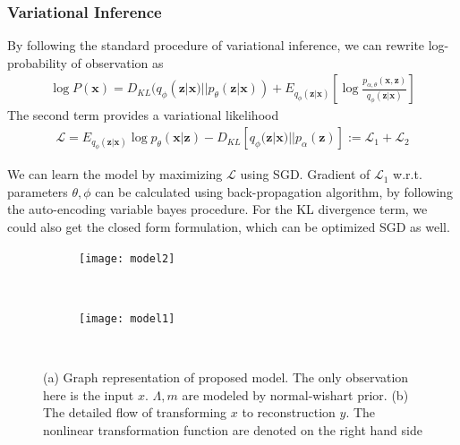 \subsubsection{Variational Inference}
By following the standard procedure of variational inference, we can rewrite log-probability of observation as
\begin{align}
\log P(\mathbf{x}) = D_{KL}(q_{\phi}(\mathbf{z}|\mathbf{x}) || p_{\theta}(\mathbf{z}|\mathbf{x})) + E_{q_{\phi}(\mathbf{z}|\mathbf{x})}[\log \frac{p_{\alpha, \theta}(\mathbf{x},\mathbf{z})}{q_{\phi}(\mathbf{z}|\mathbf{x})}]
\end{align}
The second term provides a variational likelihood
\begin{align}
\mathcal{L} = E_{q_{\phi}(\mathbf{z}|\mathbf{x})} \log p_{\theta}(\mathbf{x}|\mathbf{z}) - D_{KL}[q_{\phi}(\mathbf{z}|\mathbf{x})||p_{\alpha}(\mathbf{z})] := \mathcal{L}_1 + \mathcal{L}_2
\end{align}

We can learn the model by maximizing $\mathcal{L}$ using SGD. Gradient of $\mathcal{L}_1$ w.r.t. parameters $\theta, \phi$ can be calculated using back-propagation algorithm, by following the auto-encoding variable bayes procedure. For the KL divergence term, we could also get the closed form formulation, which can be optimized SGD as well.


\begin{figure}
        \centering
        \begin{subfigure}[b]{0.3\textwidth}
                \texttt{[image: model2]}
                \label{fig:gull}
        \end{subfigure}%
        ~ %
        \begin{subfigure}[b]{0.37\textwidth}
                \texttt{[image: model1]}
                \label{fig:tiger}
        \end{subfigure}
        ~ %
        \caption{(a) Graph representation of proposed model. The only observation here is the input $x$. $\Lambda, m$ are modeled by normal-wishart prior. (b) The detailed flow of transforming $x$ to reconstruction $y$. The nonlinear transformation function are denoted on the right hand side}
\end{figure}


